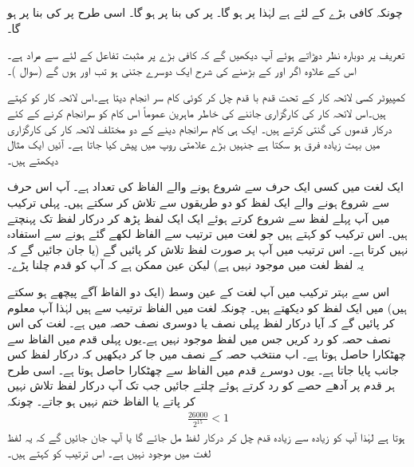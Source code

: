 چونکہ کافی بڑے  کے لئے  ہے لہٰذا  پر  ہو گا۔
 پر   کی بنا  پر  ہو گا۔ اسی طرح 
 پر   کی بنا  پر  ہو گا۔

تعریف پر دوبارہ نظر دوڑاتے ہوئے  آپ دیکھیں گے کہ کافی بڑے  پر مثبت تفاعل کے لئے  سے مراد  ہے۔ اس کے علاوہ اگر  اور   کے بڑھنے کی شرح ایک دوسرے جتنی ہو تب  اور  ہوں گے (سوال )۔ 

کمپیوٹر کسی لائحہ کار کے تحت قدم با قدم چل کر کوئی کام سر انجام دیتا ہے۔اس لائحہ کار کو  کہتے ہیں۔اس لائحہ کار کی کارگزاری جاننے کی خاطر ماہرین عموماً اس کام کو سرانجام کرنے کے کئے درکار قدموں کی گنتی کرتے ہیں۔ ایک ہی کام سرانجام دینے کے دو مختلف لائحہ کار کی کارگزاری میں بہت زیادہ فرق ہو سکتا ہے جنہیں بڑے  علامتی روپ میں پیش کیا جاتا ہے۔ آئیں ایک مثال دیکھتے ہیں۔

ایک لغت میں کسی ایک حرف سے شروع ہونے والے الفاظ کی تعداد   ہے۔ آپ اس حرف سے شروع ہونے والے ایک لفظ کو دو طریقوں سے تلاش کر سکتے ہیں۔ پہلی ترکیب میں آپ پہلے لفظ سے شروع کرتے ہوئے ایک ایک لفظ پڑھ کر درکار لفظ تک پہنچتے ہیں۔ اس ترکیب کو  کہتے ہیں جو لغت میں ترتیب سے الفاظ لکھے گئے ہونے سے استفادہ نہیں کرتا ہے۔ اس ترتیب میں آپ ہر صورت لفظ تلاش کر پائیں گے (یا جان جائیں گے کہ یہ لفظ لغت میں موجود نہیں ہے) لیکن عین ممکن ہے کہ آپ کو  قدم چلنا پڑے۔

اس سے بہتر ترکیب میں آپ لغت کے عین وسط (ایک دو الفاظ آگے پیچھے ہو سکتے ہیں) میں ایک لفظ کو دیکھتے ہیں۔ چونکہ لغت میں الفاظ ترتیب سے ہیں لہٰذا آپ معلوم کر پائیں گے کہ آیا درکار لفظ پہلی نصف یا دوسری نصف حصہ میں ہے۔ لغت کی اس نصف حصہ کو رد کریں جس میں لفظ موجود نہیں ہے۔یوں پہلی قدم میں  الفاظ سے چھٹکارا حاصل ہوتا ہے۔  اب منتخب حصہ کے نصف میں جا کر دیکھیں کہ درکار لفظ کس جانب پایا جاتا ہے۔ یوں دوسرے قدم میں  الفاظ سے چھٹکارا حاصل ہوتا ہے۔ اسی طرح ہر قدم پر آدھے حصے کو رد کرتے ہوئے چلتے جائیں جب تک آپ درکار لفظ تلاش نہیں کر پاتے یا الفاظ ختم نہیں ہو جاتے۔ چونکہ
\begin{align*}
\frac{26000}{2^{15}}<1
\end{align*}
ہوتا ہے لہٰذا  آپ کو زیادہ سے زیادہ  قدم چل کر درکار لفظ مل جائے گا یا آپ جان جائیں گے کہ یہ لفظ لغت میں موجود نہیں ہے۔ اس ترتیب کو  کہتے ہیں۔

